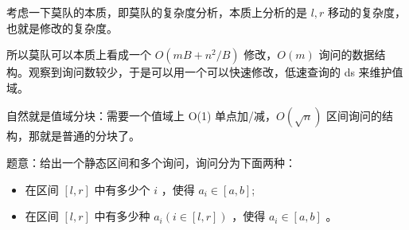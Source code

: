 \par \noindent 考虑一下莫队的本质，即莫队的复杂度分析，本质上分析的是 $l, r$ 移动的复杂度，也就是修改的复杂度。
~\\
\par \noindent 所以莫队可以本质上看成一个 $O(mB+n^2/B)$ 修改，$O(m)$ 询问的数据结构。观察到询问数较少，于是可以用一个可以快速修改，低速查询的 ds 来维护值域。
~\\
\par \noindent 自然就是值域分块：需要一个值域上 O(1) 单点加/减，$O(\sqrt n)$  区间询问的结构，那就是普通的分块了。
~\\
\begin{tcolorbox}
\par \noindent 题意：给出一个静态区间和多个询问，询问分为下面两种：
\begin{itemize}
\item 在区间 $[l, r]$ 中有多少个 $i$ ，使得 $a_i \in[a, b]$;
\item 在区间 $[l, r]$ 中有多少种 $a_i(i \in[l, r])$ ，使得 $a_i \in[a, b]$ 。
\end{itemize}
\end{tcolorbox}
